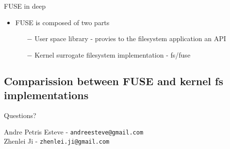 \documentclass{beamer}
\begin{document}
\begin{frame}{FUSE in deep}
	
	\begin{itemize}[<+->]

		\item{FUSE is composed of two parts}
			\begin{itemize}
				\item[$-$]{User space library - provies to the filesystem application an API}
				\item[$-$]{Kernel surrogate filesystem implementation - fs/fuse }
			\end{itemize}	
	
	\end{itemize}
	
\end{frame}

\subsection{Comparission between FUSE and kernel fs implementations}


\begin{frame}[plain]

  \begin{center}
    \Huge Questions?
  \end{center}

  \vspace{0.2in}

  \begin{center}
	Andre Petris Esteve - \texttt{andreesteve@gmail.com}\\
	Zhenlei Ji - \texttt{zhenlei.ji@gmail.com}
  \end{center}
\end{frame}
\end{document}
